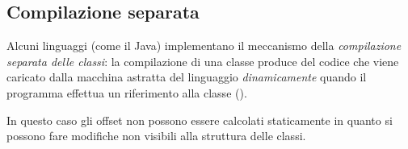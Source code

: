 
\subsection*{Compilazione separata}

Alcuni linguaggi (come il Java) implementano il meccanismo della \emph{compilazione separata delle classi}: la compilazione di una classe produce del codice che viene caricato dalla macchina astratta del linguaggio \emph{dinamicamente} quando il programma effettua un riferimento alla classe ().

In questo caso gli offset non possono essere calcolati staticamente in quanto si possono fare modifiche non visibili alla struttura delle classi.